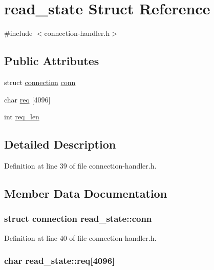 \hypertarget{structread__state}{\section{read\-\_\-state Struct Reference}
\label{structread__state}
}


{\ttfamily \#include $<$connection-\/handler.\-h$>$}

\subsection*{Public Attributes}
\begin{DoxyCompactItemize}
\item 
struct \hyperlink{structconnection}{connection} \hyperlink{structread__state_ad79008defc69c985f9a55b8f1a7dccb0}{conn}
\item 
char \hyperlink{structread__state_a5466de2b0a95c12c669ff082e4a228d0}{req} \mbox{[}4096\mbox{]}
\item 
int \hyperlink{structread__state_a5629ae045b84454938394c8af94124d1}{req\-\_\-len}
\end{DoxyCompactItemize}


\subsection{Detailed Description}


Definition at line 39 of file connection-\/handler.\-h.



\subsection{Member Data Documentation}
\hypertarget{structread__state_ad79008defc69c985f9a55b8f1a7dccb0}{
\subsubsection[{conn}]{\setlength{\rightskip}{0pt plus 5cm}struct {\bf connection} read\-\_\-state\-::conn}}\label{structread__state_ad79008defc69c985f9a55b8f1a7dccb0}


Definition at line 40 of file connection-\/handler.\-h.

\hypertarget{structread__state_a5466de2b0a95c12c669ff082e4a228d0}{
\subsubsection[{req}]{\setlength{\rightskip}{0pt plus 5cm}char read\-\_\-state\-::req\mbox{[}4096\mbox{]}}}\label{structread__state_a5466de2b0a95c12c669ff082e4a228d0}


